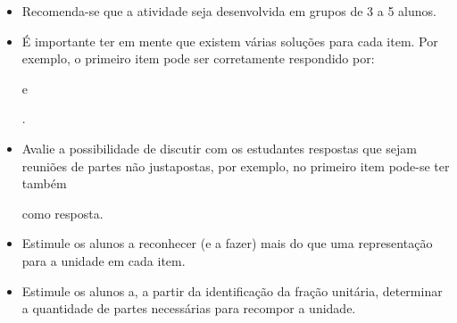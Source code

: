  \vspace{.1cm}

   \vspace{.1cm}

  \begin{itemize} %
    \item Recomenda-se que a atividade seja desenvolvida em grupos de 3 a 5 alunos.
    \item É importante ter em mente que existem várias soluções para cada item. Por exemplo, o primeiro item pode ser corretamente respondido por:             
 e
 .
    \item       Avalie a possibilidade de discutir com os estudantes respostas que sejam reuniões de partes não justapostas, por exemplo, no primeiro item pode-se ter também             
      como resposta.
    \item Estimule os alunos a reconhecer (e a fazer) mais do que uma representação para a unidade em cada item.
    \item Estimule os alunos a, a partir da identificação da fração unitária, determinar a quantidade de partes necessárias para recompor a unidade.
\end{itemize} %

